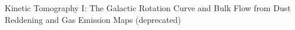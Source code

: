 Kinetic Tomography I: The Galactic Rotation Curve and Bulk Flow from Dust Reddening and Gas Emission Maps (deprecated)